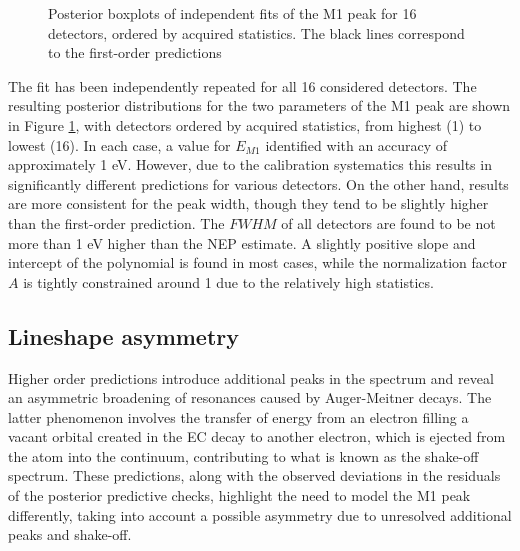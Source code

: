 \begin{figure}[t]
\caption{Posterior boxplots of independent fits of the M1 peak for 16 detectors, ordered by acquired statistics. The
black lines correspond to the first-order predictions}%
\label{fig:singlepeak}
\end{figure}
The fit has been independently repeated for all 16 considered detectors. The resulting posterior distributions for the two
parameters of the M1 peak
are shown in Figure \ref{fig:singlepeak}, with detectors ordered by acquired statistics, from highest (1) to
lowest (16). In each case, a value for $E_{M 1}$ identified with an accuracy of approximately 1 eV. However, due to the calibration
systematics this results in significantly different predictions for various detectors. On the other hand, results are more
consistent for the peak width, though they tend to be slightly higher than the first-order
prediction. The $FWHM$ of all detectors are found to be not more than 1 eV higher than the NEP estimate. A slightly positive slope and intercept of the polynomial is found in most cases,
while the normalization factor $A$ is tightly constrained around 1 due to the
relatively high statistics. 

\subsection{Lineshape asymmetry}
Higher order predictions introduce additional peaks in the spectrum and reveal an asymmetric broadening of resonances caused by Auger-Meitner decays. The latter phenomenon
involves the transfer of energy from an electron filling a vacant orbital created in the EC decay to
another electron, which is ejected from the atom into the continuum, contributing to what is known as the shake-off spectrum. These predictions, along with the observed
deviations in the residuals of the posterior predictive checks, highlight the need to model the M1 peak differently, taking into account a possible asymmetry due to unresolved additional peaks and shake-off.


